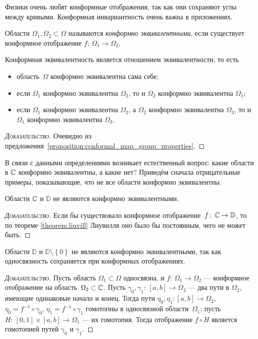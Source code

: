\documentclass[../complex-analysis.tex]{subfiles}
\begin{document}
Физики очень любят конформные отображения, так как они сохраняют углы между кривыми. Конформная инвариантность очень важна в приложениях.

\begin{df}
 Области $ \Omega_1, \Omega_2 \subset \Omega $ называются \textit{конформно эквивалентными}, если существует конформное отображение $ f \colon\, \Omega_1 \to \Omega_2 $.
\end{df}
\begin{prop}
 Конформная эквивалентность является отношением эквивалентности, то есть
 \begin{itemize}
  \item область~$ \Omega $ конформно эквивалентна сама себе;
  \item если $ \Omega_1 $ конформно эквивалентна $ \Omega_2 $, то и $ \Omega_2 $ конформно эквивалентна $ \Omega_1 $;
  \item если $ \Omega_1 $ конформно эквивалентна $ \Omega_2 $, а $ \Omega_2 $ конформно эквивалентна $ \Omega_3 $, то и $ \Omega_1 $ конформно эквивалентна $ \Omega_3 $.
 \end{itemize}
\end{prop}
\begin{proof}[\normalfont\textsc{Доказательство}]
 Очевидно из предложения~\ref{proposition:conformal_map_group_properties}.
\end{proof}

В связи с данными определениями возникает естественный вопрос: какие области в $ \mathbb{C} $ конформно эквивалентны, а какие нет? Приведём сначала отрицательные примеры, показывающие, что не все области конформно эквивалентны.

\begin{exmpl}
 Области $ \mathbb{C} $ и $ \mathbb D $ не являются конформно эквивалентными.
\end{exmpl}
\begin{proof}[\normalfont\textsc{Доказательство}]
  Если бы существовало конформное отображение~$ f\colon\,\mathbb{C} \to \mathbb D $, то по теореме \ref{theorem:liuvill} Лиувилля оно было бы постоянным, чего не может быть.
\end{proof}
\begin{exmpl}
 Области $ \mathbb D $ и $ \mathbb D \setminus \left\{ 0 \right\} $ не являются конформно эквивалентными, так как односвязность сохраняется при конформных отображениях.
\end{exmpl}
\begin{proof}[\normalfont\textsc{Доказательство}]
 Пусть область $ \Omega_1 \subset \Omega $ односвязна, и $ f \colon\, \Omega_1 \to \Omega_2 $ --- конформное отображение на область~$ \Omega_2 \subset \mathbb{C} $. Пусть $ \gamma_0, \gamma_1 \colon\,[a,b] \to \Omega_2 $ --- два пути в $ \Omega_2 $, имеющие одинаковые начало и конец. Тогда пути $ \eta_0,\eta_1 \colon [a,b] \to \Omega_2 $, $ \eta_0 = f^{-1} \circ \gamma_0 $, $ \eta_1 = f^{-1} \circ \gamma_1 $ гомотопны в односвязной области~$ \Omega_1 $; пусть $ H \colon\,[0,1] \times [a,b] \to \Omega_1 $ --- их гомотопия. Тогда отображение $ f \circ H $ является гомотопией путей $ \gamma_0 $ и $ \gamma_1 $.
\end{proof}
\end{document}
